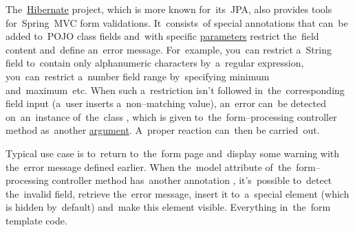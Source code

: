 The~\hyperref[hibernate]{Hibernate} project, which is more known for~its~JPA, also provides tools for~Spring~MVC form validations.
It~consists~of special annotations that can~be added to~POJO class fields and~with specific \hyperref[parameterargument]{parameters} restrict the~field content and~define an~error message.
For~example, you~can restrict a~String field to~contain only alphanumeric characters by~a~regular expression, you~can~restrict a~number field range by~specifying minimum and~maximum~etc.
When such a~restriction isn't followed in~the~corresponding field input (a~user inserts a~non--matching value), an~error can~be detected on~an~instance of~the~class , which is given to~the~form--processing controller method as~another \hyperref[parameterargument]{argument}.
A~proper reaction can~then be carried~out.

Typical use case is to~return to~the~form page and~display some warning with the~error message defined earlier.
When the~model attribute of~the~form--processing controller method has~another annotation , it's~possible to~detect the~invalid field, retrieve the~error message, insert it to~a~special element (which is hidden by~default) and~make this element visible.
Everything in~the~form template code.
\newpage

